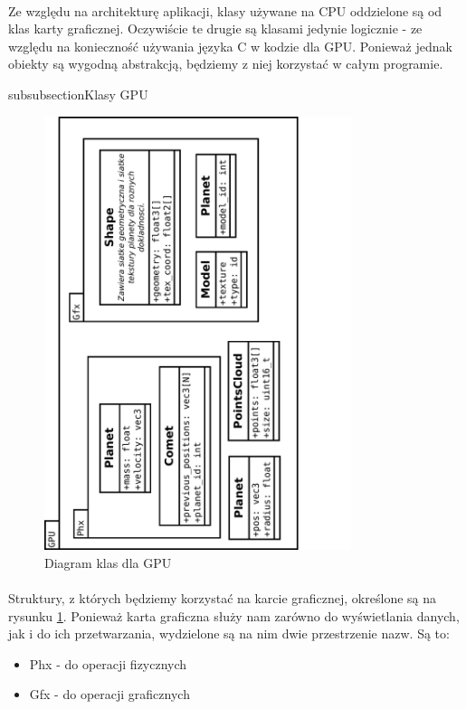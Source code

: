 \paragraph{}
Ze względu na architekturę aplikacji, klasy używane na CPU oddzielone są od klas karty graficznej. Oczywiście te drugie są klasami jedynie logicznie - ze względu na konieczność używania języka C w kodzie dla GPU. Ponieważ jednak obiekty są wygodną abstrakcją, będziemy z niej korzystać w całym programie.

subsubsection{Klasy GPU}

\begin{figure}[h]
	\centering
	\includegraphics[angle=270,width=0.8\textwidth]{class_gpu.pdf}
	\caption{Diagram klas dla GPU}
	\label{fig:class_gpu}
\end{figure}

\paragraph{}
Struktury, z których będziemy korzystać na karcie graficznej, określone są na rysunku \ref{fig:class_gpu}. Ponieważ karta graficzna służy nam zarówno do wyświetlania danych, jak i do ich przetwarzania, wydzielone są na nim dwie przestrzenie nazw. Są to:
\begin{itemize}
	\item{Phx - do operacji fizycznych}
	\item{Gfx - do operacji graficznych}
\end{itemize}


